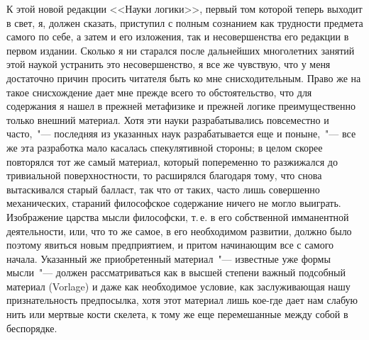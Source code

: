 К этой новой редакции <<Науки логики>>, первый том
которой теперь выходит в свет, я, должен сказать, приступил
с полным сознанием как трудности предмета
самого по себе, а затем и его изложения, так и несовершенства
его редакции в первом издании. Сколько я ни старался
после дальнейших многолетних занятий этой наукой
устранить это несовершенство, я все же чувствую,
что у меня достаточно причин просить читателя быть ко
мне снисходительным. Право же на такое снисхождение
дает мне прежде всего то обстоятельство, что для содержания
я нашел в прежней метафизике и прежней логике
преимущественно только внешний материал. Хотя эти
науки разрабатывались повсеместно и часто,~"--- последняя
из указанных наук разрабатывается еще и поныне,~"--- все
же эта разработка мало касалась спекулятивной стороны;
в целом скорее повторялся тот же самый материал, который
попеременно то разжижался до тривиальной поверхностности,
то расширялся благодаря тому, что снова вытаскивался
старый балласт, так что от таких, часто лишь
совершенно механических, стараний философское содержание
ничего не могло выиграть. Изображение царства
мысли философски, т.\,е. в его собственной имманентной
деятельности, или, что то же самое, в его необходимом
развитии, должно было поэтому явиться новым предприятием,
и притом начинающим все с самого начала. Указанный
же приобретенный материал~"--- известные уже
формы мысли~"--- должен рассматриваться как в высшей
степени важный подсобный материал (Vorlage) и даже
как необходимое условие, как заслуживающая нашу признательность
предпосылка, хотя этот материал лишь кое-где
дает нам слабую нить или мертвые кости скелета, к
тому же еще перемешанные между собой в беспорядке.


